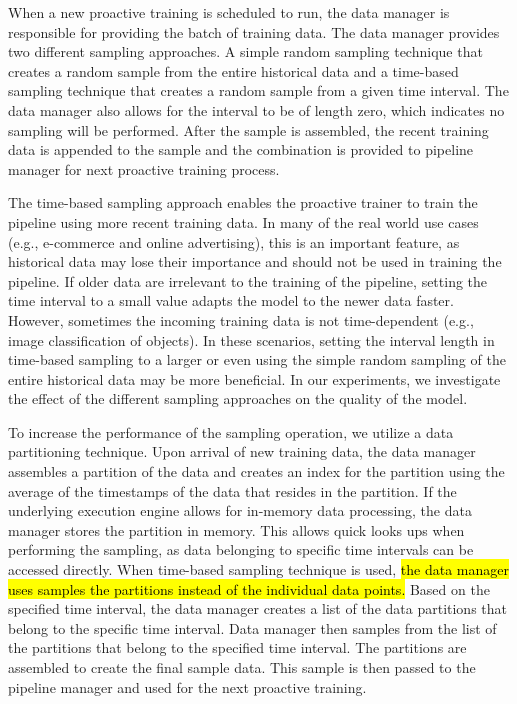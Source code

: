 When a new proactive training is scheduled to run, the data manager is responsible for providing the batch of training data.
The data manager provides two different sampling approaches.
A simple random sampling technique that creates a random sample from the entire historical data and a time-based sampling technique that creates a random sample from a given time interval.
The data manager also allows for the interval to be of length zero, which indicates no sampling will be performed.
After the sample is assembled, the recent training data is appended to the sample and the combination is provided to pipeline manager for next proactive training process.

The time-based sampling approach enables the proactive trainer to train the pipeline using more recent training data.
In many of the real world use cases (e.g., e-commerce and online advertising), this is an important feature, as historical data may lose their importance and should not be used in training the pipeline.
If older data are irrelevant to the training of the pipeline, setting the time interval to a small value adapts the model to the newer data faster.
However, sometimes the incoming training data is not time-dependent (e.g., image classification of objects).
In these scenarios, setting the interval length in time-based sampling to a larger or even using the simple random sampling of the entire historical data may be more beneficial.
In our experiments, we investigate the effect of the different sampling approaches on the quality of the model.

To increase the performance of the sampling operation, we utilize a data partitioning technique.
Upon arrival of new training data, the data manager assembles a partition of the data and creates an index for the partition using the average of the timestamps of the data that resides in the partition.
If the underlying execution engine allows for in-memory data processing, the data manager stores the partition in memory.
This allows quick looks ups when performing the sampling, as data belonging to specific time intervals can be accessed directly.
When time-based sampling technique is used, \hl{the data manager uses samples the partitions instead of the individual data points.}
Based on the specified time interval, the data manager creates a list of the data partitions that belong to the specific time interval.
Data manager then samples from the list of the partitions that belong to the specified time interval.
The partitions are assembled to create the final sample data.
This sample is then passed to the pipeline manager and used for the next proactive training.

